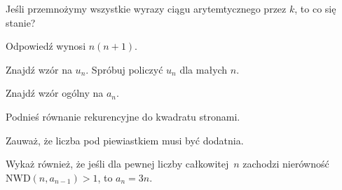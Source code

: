
\begin{hints_list}
	\item Jeśli przemnożymy wszystkie wyrazy ciągu arytemtycznego przez $k$, to co się stanie?
	\item Odpowiedź wynosi $n(n + 1)$.
	\item Znajdź wzór na $u_n$. Spróbuj policzyć $u_n$ dla małych $n$.
	\item Znajdź wzór ogólny na $a_n$.
	\item Podnieś równanie rekurencyjne do kwadratu stronami.
	\item Zauważ, że liczba pod piewiastkiem musi być dodatnia.
	\item Wykaż również, że jeśli dla pewnej liczby całkowitej~$n$ zachodzi nierówność $\mathrm{NWD}(n, a_{n - 1}) > 1$, to $a_n = 3n$.
\end{hints_list}